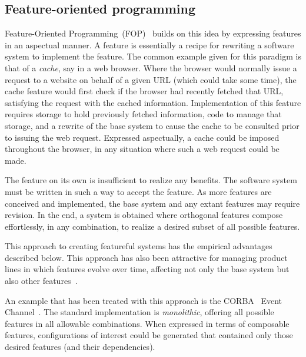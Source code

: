 \documentclass[sigplan,anonymous,review]{acmart}
\begin{document}
\subsection{Feature-oriented programming}\label{sec:priorfop}
Feature-Oriented Programming~(FOP)~\cite{prehofer1997feature} builds on this idea by expressing features in an aspectual manner. A feature is essentially a recipe for rewriting a software system to implement the feature. The common example given for this paradigm is that of a \emph{cache}, say in a web browser.  Where the browser would normally issue a request to a website on behalf of a given URL (which could take some time), the cache feature would first check if the browser had recently fetched that URL, satisfying the request with the cached information. Implementation of this feature requires storage to hold previously fetched information, code to manage that storage, and a rewrite of the base system to cause the cache to be consulted prior to issuing the web request. Expressed aspectually, a cache could be imposed throughout the browser, in any situation where such a web request could be made.

The feature on its own is insufficient to realize any benefits. The software system must be written in such a way to accept the feature. As more features are conceived and implemented, the base system and any extant features may require revision. In the end, a system is obtained where orthogonal features compose effortlessly, in any combination, to realize a desired subset of all possible features.

This approach to creating featureful systems has the empirical advantages described below. This approach has also been attractive for managing product lines in which features evolve over time, affecting not only the base system but also other features~\cite{10.1145/2897695.2897701}.

An example that has been treated with this approach is the CORBA~\cite{CORBA:00} Event Channel~\cite{CORBAService:02a}. The standard implementation is \emph{monolithic}, offering all possible features in all allowable combinations.    
When expressed in terms of composable features, configurations of interest could be generated that contained only those desired features (and their dependencies).

\end{document}
